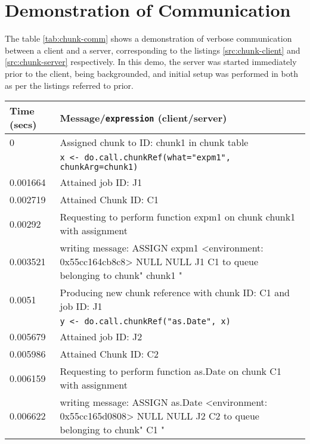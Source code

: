 \documentclass[a4paper,10pt]{article}
\begin{document}
\section{Demonstration of Communication}

The table \ref{tab:chunk-comm} shows a demonstration of verbose communication
between a client and a server, corresponding to the listings
\ref{src:chunk-client} and \ref{src:chunk-server} respectively.
In this demo, the server was started immediately prior to the client, being
backgrounded, and initial setup was performed in both as per the listings
referred to prior.

\begin{table}
	\def\clientcolour{mybrown}
	\def\servercolour{mynavy}
	\centering
	\begin{tabularx}{\textwidth}{lX}
		\toprule
		Time (secs)  & Message/\texttt{expression} (\textcolor{\clientcolour}{client}/\textcolor{\servercolour}{server}) \\
		\midrule
		0        & \textcolor{\servercolour}{Assigned chunk to ID: chunk1 in chunk table} \\
			 & \textcolor{\clientcolour}{\texttt{x <- do.call.chunkRef(what="expm1", chunkArg=chunk1)} } \\
		0.001664 & \textcolor{\clientcolour}{Attained job ID:  J1} \\
		0.002719 & \textcolor{\clientcolour}{Attained Chunk ID:  C1} \\
		0.00292  & \textcolor{\clientcolour}{Requesting to perform function expm1 on chunk chunk1 with assignment} \\
		0.003521 & \textcolor{\clientcolour}{writing message: ASSIGN expm1 <environment: 0x55cc164cb8c8> NULL NULL J1 C1 to queue belonging to chunk" chunk1 "} \\
		0.0051   & \textcolor{\clientcolour}{Producing new chunk reference with chunk ID: C1 and job ID: J1} \\
			 & \textcolor{\clientcolour}{\texttt{y <- do.call.chunkRef("as.Date", x)}} \\
		0.005679 & \textcolor{\clientcolour}{Attained job ID:  J2} \\
		0.005986 & \textcolor{\clientcolour}{Attained Chunk ID:  C2} \\
		0.006159 & \textcolor{\clientcolour}{Requesting to perform function as.Date on chunk C1 with assignment} \\
		0.006622 & \textcolor{\clientcolour}{writing message: ASSIGN as.Date <environment: 0x55cc165d0808> NULL NULL J2 C2 to queue belonging to chunk" C1 "} \\

\end{tabularx}
\end{table}
\end{document}
